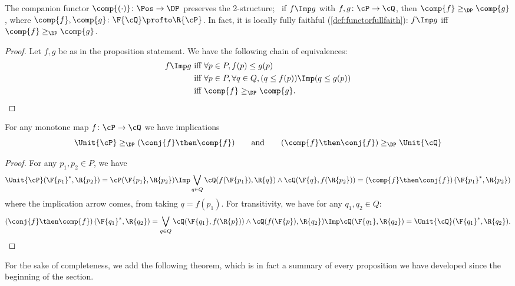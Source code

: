 \begin{proposition}
  \label{prop:companion_2}
  The companion functor $\comp{(\cdot)}\colon\Pos\to\DP$ preserves the 2-structure; \ie \ if $f\Imp g$ with $f,g\colon \cP \to\cQ $, then $\comp{f}\geq_\DP\comp{g}$, where $\comp{f},\comp{g}\colon \F{\cQ} \profto\R{\cP}$. In fact, it is locally fully faithful (\cref{def:functorfullfaith}): $f\Imp g$ iff $\comp{f}\geq_\DP \comp{g}$.
\end{proposition}
\begin{proof}
  Let $f,g$ be as in the proposition statement. We have the following chain of equivalences:
  \begin{equation}
    \begin{aligned}
      f\Imp g&\text{ iff }
      \forall p\in P, f(p)\leq g(p)\\&\text{ iff }
      \forall p\in P, \forall q\in Q, (q\leq f(p))\Imp (q\leq g(p))\\&\text{ iff }
      \comp{f}\geq_\DP \comp{g}.
    \end{aligned}
  \end{equation}
\end{proof}

\begin{proposition}
  \label{lem:comp_conj_adj}
  For any monotone map $f\colon\cP \to\cQ $ we have implications
  \begin{equation}
    \Unit{\cP }\geq_\DP (\conj{f}\then \comp{f})
    \qquad\text{and}\qquad
    (\comp{f}\then \conj{f})\geq_\DP \Unit{\cQ }
  \end{equation}
\end{proposition}
\begin{proof}
  For any $p_1,p_2\in P$, we have
  \begin{equation}
    \Unit{\cP }(\F{p_1}^*,\R{p_2})=\cP (\F{p_1},\R{p_2})
    \Imp\bigvee_{q\in Q}\cQ (f(\F{p_1}),\R{q})\wedge\cQ (\F{q},f(\R{p_2}))=\left(\comp{f}\then \conj{f}\right)(\F{p_1}^*,\R{p_2})
  \end{equation}
  where the implication arrow comes, \eg  from taking $q=f(p_1)$. For transitivity, we have for any $q_1,q_2\in Q$:
  \begin{equation}
    \left(\conj{f}\then \comp{f}\right)(\F{q_1}^*,\R{q_2})=\bigvee_{q\in Q}\cQ (\F{q_1},f(\R{p}))\wedge\cQ (f(\F{p}),\R{q_2})
    \Imp\cQ (\F{q_1},\R{q_2})=\Unit{\cQ }(\F{q_1}^*,\R{q_2}).
  \end{equation}
\end{proof}

For the sake of completeness, we add the following theorem, which is in fact a summary of every proposition we have developed since the beginning of the section.

